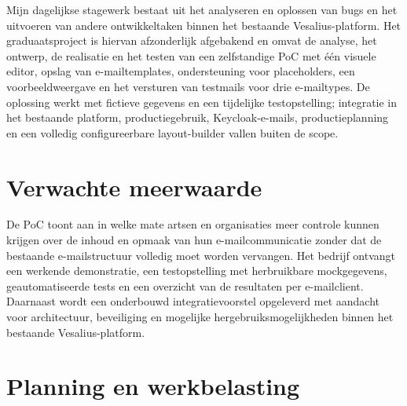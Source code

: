 Mijn dagelijkse stagewerk bestaat uit het analyseren en oplossen van bugs en
het uitvoeren van andere ontwikkeltaken binnen het bestaande Vesalius-platform.
Het graduaatsproject is hiervan afzonderlijk afgebakend en omvat de analyse,
het ontwerp, de realisatie en het testen van een zelfstandige PoC met één
visuele editor, opslag van e-mailtemplates, ondersteuning voor placeholders,
een voorbeeldweergave en het versturen van testmails voor drie e-mailtypes.
De oplossing werkt met fictieve gegevens en een tijdelijke testopstelling;
integratie in het bestaande platform, productiegebruik, Keycloak-e-mails,
productieplanning en een volledig configureerbare layout-builder vallen buiten
de scope.


\section{Verwachte meerwaarde}%
\label{vst:meerwaarde}


De PoC toont aan in welke mate artsen en organisaties meer controle kunnen
krijgen over de inhoud en opmaak van hun e-mailcommunicatie zonder dat de
bestaande e-mailstructuur volledig moet worden vervangen. Het bedrijf ontvangt
een werkende demonstratie, een testopstelling met herbruikbare mockgegevens,
geautomatiseerde tests en een overzicht van de resultaten per e-mailclient.
Daarnaast wordt een onderbouwd integratievoorstel opgeleverd met aandacht voor
architectuur, beveiliging en mogelijke hergebruiksmogelijkheden binnen het
bestaande Vesalius-platform.


\section{Planning en werkbelasting}%
\label{vst:planning}


